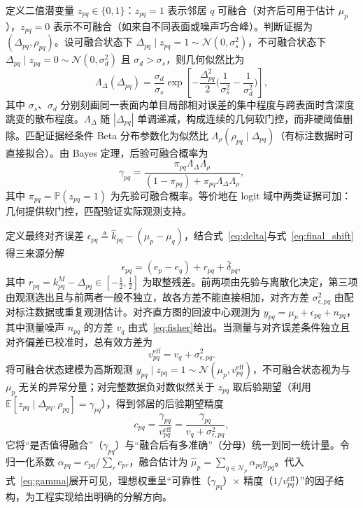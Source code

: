 定义二值潜变量 $z_{pq}\in\{0,1\}$：$z_{pq}=1$ 表示邻居 $q$ 可融合（对齐后可用于估计 $\mu_p$），$z_{pq}=0$ 表示不可融合（如来自不同表面或噪声巧合峰）。判断证据为 $(\Delta_{pq},\rho_{pq})$。设可融合状态下 $\Delta_{pq}\mid z_{pq}=1\sim\mathcal{N}(0,\sigma_s^2)$，不可融合状态下 $\Delta_{pq}\mid z_{pq}=0\sim\mathcal{N}(0,\sigma_d^2)$ 且 $\sigma_d>\sigma_s$，则几何似然比为
\begin{equation}
  \Lambda_{\Delta}(\Delta_{pq})
  =\frac{\sigma_d}{\sigma_s}
  \exp\!\left[-\frac{\Delta_{pq}^2}{2}\Big(\frac{1}{\sigma_s^2}-\frac{1}{\sigma_d^2}\Big)\right],
  \label{eq:lambda_delta}
\end{equation}
其中 $\sigma_s$、$\sigma_d$ 分别刻画同一表面内单目局部相对误差的集中程度与跨表面时含深度跳变的散布程度。$\Lambda_\Delta$ 随 $|\Delta_{pq}|$ 单调递减，构成连续的几何软门控，而非硬阈值删除。匹配证据经条件 Beta 分布参数化为似然比 $\Lambda_\rho(\rho_{pq}\mid\Delta_{pq})$（有标注数据时可直接拟合）。由 Bayes 定理，后验可融合概率为
\begin{equation}
  \gamma_{pq}
  =\frac{\pi_{pq}\Lambda_{\Delta}\Lambda_{\rho}}
  {(1-\pi_{pq})+\pi_{pq}\Lambda_{\Delta}\Lambda_{\rho}},
  \label{eq:gamma}
\end{equation}
其中 $\pi_{pq}=\mathbb{P}(z_{pq}=1)$ 为先验可融合概率。等价地在 logit 域中两类证据可加：几何提供软门控，匹配验证实际观测支持。

定义最终对齐误差 $\epsilon_{pq}\triangleq\hat k_{pq}-(\mu_p-\mu_q)$，结合式~\eqref{eq:delta}与式~\eqref{eq:final_shift}得三来源分解
\begin{equation}
  \epsilon_{pq}=(e_p-e_q)+r_{pq}+\hat\delta_{pq},
  \label{eq:epsilon}
\end{equation}
其中 $r_{pq}=k_{pq}^{M}-\Delta_{pq}\in[-\tfrac12,\tfrac12]$ 为取整残差。前两项由先验与离散化决定，第三项由观测选出且与前两者一般不独立，故各方差不能直接相加，对齐方差 $\sigma_{\epsilon,pq}^2$ 由配对标注数据或重复观测估计。对齐直方图的回波中心观测为 $y_{pq}=\mu_p+\epsilon_{pq}+n_{pq}$，其中测量噪声 $n_{pq}$ 的方差 $v_q$ 由式~\eqref{eq:fisher}给出。当测量与对齐误差条件独立且对齐偏差已校准时，总有效方差为
\begin{equation}
  v_{pq}^{\mathrm{eff}}=v_q+\sigma_{\epsilon,pq}^{2}.
  \label{eq:veff}
\end{equation}
将可融合状态建模为高斯观测 $y_{pq}\mid z_{pq}=1\sim\mathcal{N}(\mu_p,v_{pq}^{\mathrm{eff}})$，不可融合状态视为与 $\mu_p$ 无关的异常分量；对完整数据负对数似然关于 $z_{pq}$ 取后验期望（利用 $\mathbb{E}[z_{pq}\mid\Delta_{pq},\rho_{pq}]=\gamma_{pq}$），得到邻居的后验期望精度
\begin{equation}
  c_{pq}=\frac{\gamma_{pq}}{v_{pq}^{\mathrm{eff}}}
  =\frac{\gamma_{pq}}{v_q+\sigma_{\epsilon,pq}^{2}},
  \label{eq:c_pq}
\end{equation}
它将``是否值得融合''（$\gamma_{pq}$）与``融合后有多准确''（分母）统一到同一统计量。令归一化系数 $\alpha_{pq}=c_{pq}/\sum_{r}c_{pr}$，融合估计为 $\hat\mu_p=\sum_{q\in\mathcal{N}_p}\alpha_{pq}y_{pq}$。代入式~\eqref{eq:gamma}展开可见，理想权重呈``可靠性（$\gamma_{pq}$）$\times$ 精度（$1/v_{pq}^{\mathrm{eff}}$）''的因子结构，为工程实现给出明确的分解方向。

